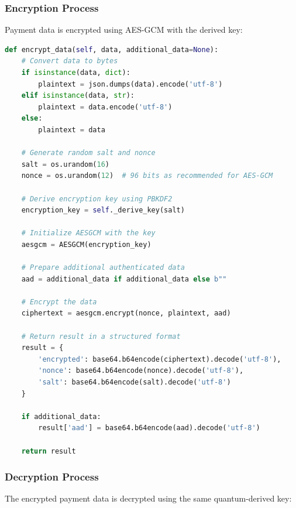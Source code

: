 \documentclass[conference]{IEEEtran}
\begin{document}
\subsubsection{Encryption Process}
Payment data is encrypted using AES-GCM with the derived key:

\begin{lstlisting}[language=Python, caption=Data Encryption Using Quantum Key]
def encrypt_data(self, data, additional_data=None):
    # Convert data to bytes
    if isinstance(data, dict):
        plaintext = json.dumps(data).encode('utf-8')
    elif isinstance(data, str):
        plaintext = data.encode('utf-8')
    else:
        plaintext = data
    
    # Generate random salt and nonce
    salt = os.urandom(16)
    nonce = os.urandom(12)  # 96 bits as recommended for AES-GCM
    
    # Derive encryption key using PBKDF2
    encryption_key = self._derive_key(salt)
    
    # Initialize AESGCM with the key
    aesgcm = AESGCM(encryption_key)
    
    # Prepare additional authenticated data
    aad = additional_data if additional_data else b""
    
    # Encrypt the data
    ciphertext = aesgcm.encrypt(nonce, plaintext, aad)
    
    # Return result in a structured format
    result = {
        'encrypted': base64.b64encode(ciphertext).decode('utf-8'),
        'nonce': base64.b64encode(nonce).decode('utf-8'),
        'salt': base64.b64encode(salt).decode('utf-8')
    }
    
    if additional_data:
        result['aad'] = base64.b64encode(aad).decode('utf-8')
    
    return result
\end{lstlisting}

\subsubsection{Decryption Process}
The encrypted payment data is decrypted using the same quantum-derived key:
\end{document}

